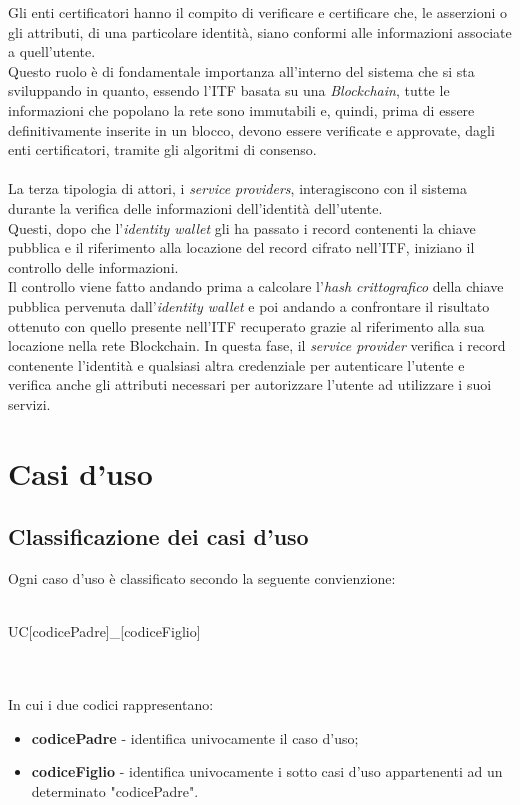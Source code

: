 Gli enti certificatori hanno il compito di verificare e certificare che, le asserzioni o gli attributi, di una particolare identità, siano conformi alle informazioni associate a quell'utente.\\
Questo ruolo è di fondamentale importanza all'interno del sistema che si sta sviluppando in quanto, essendo l'\gls{ITF} basata su una \textit{Blockchain}, tutte le informazioni che popolano la rete sono immutabili e, quindi, prima di essere definitivamente inserite in un blocco, devono essere verificate e approvate, dagli enti certificatori, tramite gli algoritmi di consenso.\\\\
La terza tipologia di attori, i \textit{service providers}, interagiscono con il sistema durante la verifica delle informazioni dell'identità dell'utente.\\
Questi, dopo che l'\textit{identity wallet} gli ha passato i record contenenti la chiave pubblica e il riferimento alla locazione del record cifrato nell'\gls{ITF}, iniziano il  controllo delle informazioni.\\
Il controllo viene fatto andando prima a calcolare l'\textit{hash crittografico} della chiave pubblica pervenuta dall'\textit{identity wallet} e poi andando a confrontare il risultato ottenuto con quello presente nell'\gls{ITF} recuperato grazie al riferimento alla sua locazione nella rete Blockchain.
In questa fase, il \textit{service provider} verifica i record contenente l'identità e qualsiasi altra credenziale per autenticare l'utente e verifica anche gli attributi necessari per autorizzare l'utente ad utilizzare i suoi servizi.
\section{Casi d'uso}
\subsection{Classificazione dei casi d'uso}
Ogni caso d'uso è classificato secondo la seguente convienzione:\\\\
\centerline{UC[codicePadre]\_[codiceFiglio]}\\\\
In cui i due codici rappresentano:
\begin{itemize}
	\item \textbf{codicePadre} - identifica univocamente il caso d'uso;
	\item \textbf{codiceFiglio} - identifica univocamente i sotto casi d'uso appartenenti ad un determinato "codicePadre".
\end{itemize}

